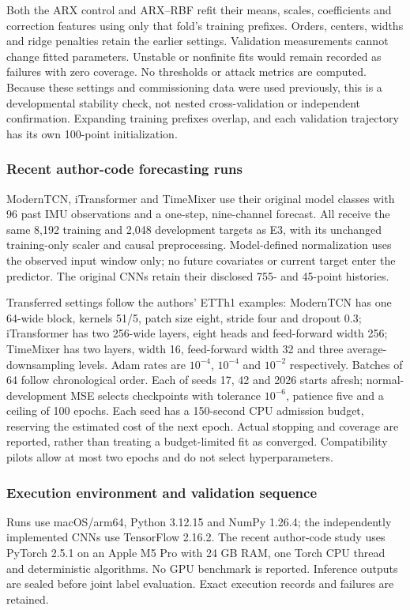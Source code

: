 Both the ARX control and ARX--RBF refit their means, scales, coefficients and correction features using only that fold's training prefixes. Orders, centers, widths and ridge penalties retain the earlier settings. Validation measurements cannot change fitted parameters. Unstable or nonfinite fits would remain recorded as failures with zero coverage. No thresholds or attack metrics are computed. Because these settings and commissioning data were used previously, this is a developmental stability check, not nested cross-validation or independent confirmation. Expanding training prefixes overlap, and each validation trajectory has its own 100-point initialization.

\subsubsection{Recent author-code forecasting runs}
ModernTCN, iTransformer and TimeMixer use their original model classes with 96 past IMU observations and a one-step, nine-channel forecast. All receive the same 8,192 training and 2,048 development targets as E3, with its unchanged training-only scaler and causal preprocessing. Model-defined normalization uses the observed input window only; no future covariates or current target enter the predictor. The original CNNs retain their disclosed 755- and 45-point histories.

Transferred settings follow the authors' ETTh1 examples: ModernTCN has one 64-wide block, kernels 51/5, patch size eight, stride four and dropout 0.3; iTransformer has two 256-wide layers, eight heads and feed-forward width 256; TimeMixer has two layers, width 16, feed-forward width 32 and three average-downsampling levels. Adam rates are $10^{-4}$, $10^{-4}$ and $10^{-2}$ respectively. Batches of 64 follow chronological order. Each of seeds 17, 42 and 2026 starts afresh; normal-development MSE selects checkpoints with tolerance $10^{-6}$, patience five and a ceiling of 100 epochs. Each seed has a 150-second CPU admission budget, reserving the estimated cost of the next epoch. Actual stopping and coverage are reported, rather than treating a budget-limited fit as converged. Compatibility pilots allow at most two epochs and do not select hyperparameters.

\subsubsection{Execution environment and validation sequence}
Runs use macOS/arm64, Python 3.12.15 and NumPy 1.26.4; the independently implemented CNNs use TensorFlow 2.16.2. The recent author-code study uses PyTorch 2.5.1 on an Apple M5 Pro with 24 GB RAM, one Torch CPU thread and deterministic algorithms. No GPU benchmark is reported. Inference outputs are sealed before joint label evaluation. Exact execution records and failures are retained.

